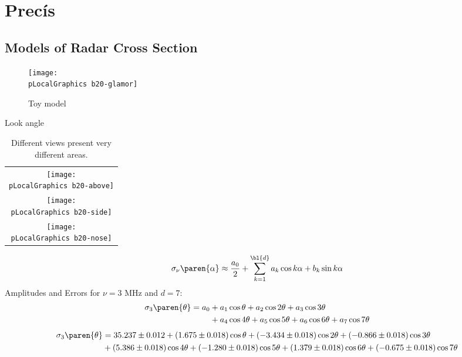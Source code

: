 % 

\section{Prec\'is}

\subsection{Models of Radar Cross Section}
\begin{figure}[htbp] 
   \centering
   \texttt{[image: \\pLocalGraphics b20-glamor]} 
   \caption{Toy model}
   \label{fig:toy}
\end{figure}

Look angle
\begin{table}[htp]
\begin{center}
\begin{tabular}{c}
	\texttt{[image: \\pLocalGraphics b20-above]} \\
	\texttt{[image: \\pLocalGraphics b20-side]} \\
	\texttt{[image: \\pLocalGraphics b20-nose]} \\
\end{tabular}
\end{center}
\caption{Different views present very different areas.}
\label{tab:views}
\end{table}%

\begin{equation}
	\sigma_{\nu}\paren{\alpha}  \approx \dfrac{a_{0}}{2} + \sum_{k=1}^{\bl{d}}a_{k}\cos k\alpha + b_{k}\sin k\alpha
\label{eq:fourier}
\end{equation}
Amplitudes and Errors for $\nu=3$ MHz and $d=7$:
	\begin{equation*}
		\begin{split}
			\sigma_{3}\paren{\theta} = a_{0} &+  a_{1}\cos \theta  +  a_{2}\cos 2\theta +  a_{3}\cos 3\theta\\
				& +  a_{4}\cos 4\theta +  a_{5}\cos 5\theta+  a_{6}\cos 6\theta +  a_{7}\cos 7\theta
		\end{split}
	\end{equation*}	
	\begin{equation*}
		\begin{split}
			\sigma_{3}\paren{\theta} &= 35.237 \pm 0.012   +  (1.675 \pm 0.018) \cos \theta  +  (-3.434 \pm 0.018) \cos 2\theta  +  (-0.866 \pm 0.018) \cos 3\theta   \\
			&+  (5.386 \pm 0.018) \cos 4\theta  +  (-1.280 \pm 0.018) \cos 5\theta  +  (1.379 \pm 0.018) \cos 6\theta +   (-0.675 \pm 0.018) \cos 7\theta
		\end{split}
	\end{equation*}	
	

